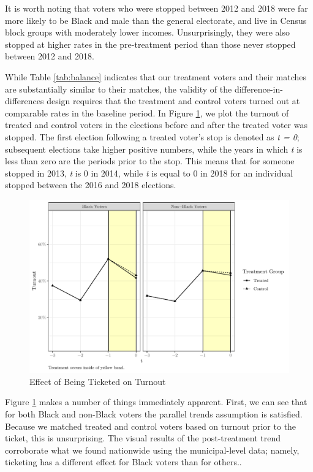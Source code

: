 \documentclass[
  12pt,
]{article}
\begin{document}
It is worth noting that voters who were stopped between 2012 and 2018 were far more likely to be Black and male than the general electorate, and live in Census block groups with moderately lower incomes. Unsurprisingly, they were also stopped at higher rates in the pre-treatment period than those never stopped between 2012 and 2018.

While Table \ref{tab:balance} indicates that our treatment voters and their matches are substantially similar to their matches, the validity of the difference-in-differences design requires that the treatment and control voters turned out at comparable rates in the baseline period. In Figure \ref{fig:did1}, we plot the turnout of treated and control voters in the elections before and after the treated voter was stopped. The first election following a treated voter's stop is denoted as \emph{t = 0}; subsequent elections take higher positive numbers, while the years in which \emph{t} is less than zero are the periods prior to the stop. This means that for someone stopped in 2013, \emph{t} is 0 in 2014, while \emph{t} is equal to 0 in 2018 for an individual stopped between the 2016 and 2018 elections.

\begin{figure}[H]

{\centering \includegraphics{draft_paper_files/figure-latex/did1-1} 

}

\caption{\label{fig:did-1}Effect of Being Ticketed on Turnout}\label{fig:did1}
\end{figure}

Figure \ref{fig:did1} makes a number of things immediately apparent. First, we can see that for both Black and non-Black voters the parallel trends assumption is satisfied. Because we matched treated and control voters based on turnout prior to the ticket, this is unsurprising. The visual results of the post-treatment trend corroborate what we found nationwide using the municipal-level data; namely, ticketing has a different effect for Black voters than for others..
\end{document}
